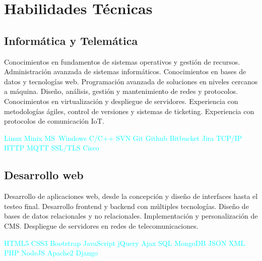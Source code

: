 \documentclass[11pt,a4paper,sans,spanish]{moderncv}
\begin{document}
\section{Habilidades Técnicas}

\subsection{Informática y Telemática}
{Conocimientos en fundamentos de sistemas operativos y gestión de recursos.}\quad
{Administración avanzada de sistemas informáticos.}\quad
{Conocimientos en bases de datos y tecnologías web.}\quad
{Programación avanzada de soluciones en niveles cercanos a máquina.}\quad
{Diseño, análisis, gestión y mantenimiento de redes y protocolos.}\quad
{Conocimientos en virtualización y despliegue de servidores.}\quad
{Experiencia con metodologías ágiles, control de versiones y sistemas de ticketing.}\quad
{Experiencia con protocolos de comunicación IoT.}

\begin{center}
\textcolor{cyan}{
Linux \quad{} Minix \quad{} MS~Windows \quad{} C/C++ \quad{} SVN \quad{} Git \quad{}
Github \quad{} Bitbucket \quad{} Jira \quad{} TCP/IP \quad{} HTTP \quad{}
MQTT \quad{} SSL/TLS \quad{} Cisco
}
\end{center}

\subsection{Desarrollo web}
{Desarrollo de aplicaciones web, desde la concepción y diseño de interfaces hasta el testeo final.}\quad
{Desarrollo frontend y backend con múltiples tecnologías.}\quad
{Diseño de bases de datos relacionales y no relacionales.}\quad
{Implementación y personalización de CMS.}\quad
{Despliegue de servidores en redes de telecomunicaciones.}

\begin{center}
\textcolor{cyan}{
HTML5 \quad{} CSS3 \quad{} Bootstrap \quad{} JavaScript \quad{} jQuery \quad{}
Ajax \quad{} SQL \quad{} MongoDB \quad{} JSON \quad{} XML \quad{} PHP \quad{}
NodeJS \quad{} Apache2 \quad{} Django
}
\end{center}
\end{document}
